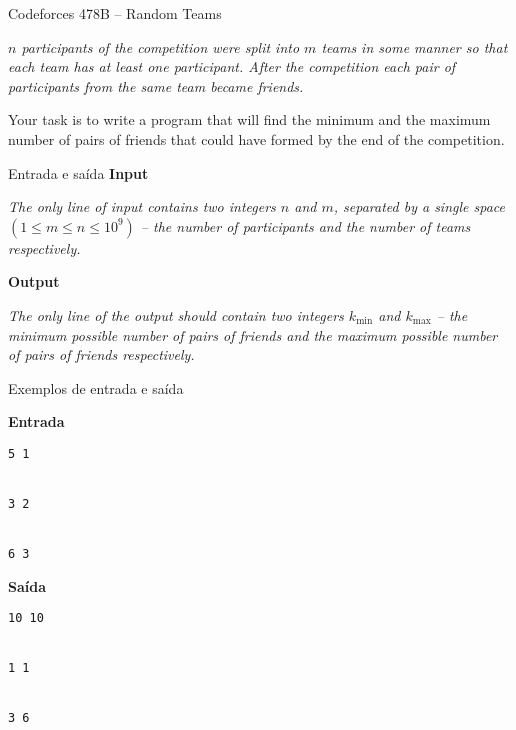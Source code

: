 \begin{frame}[fragile]{Codeforces 478B -- Random Teams}

{\it
$n$ participants of the competition were split into $m$ teams in some manner so that each team has at least one participant. After the competition each pair of participants from the same team became friends.

Your task is to write a program that will find the minimum and the maximum number of pairs of friends that could have formed by the end of the competition.
}

\end{frame}

\begin{frame}[fragile]{Entrada e saída}
\textbf{Input}

{\it
The only line of input contains two integers $n$ and $m$, separated by a single space $(1 \leq m \leq n \leq 10^9)$ -- the number of participants and the number of teams respectively.
}

\vspace{0.2in}

\textbf{Output}

{\it
The only line of the output should contain two integers $k_{\min}$ and $k_{\max}$ -- the minimum possible number of pairs of friends and the maximum possible number of pairs of friends respectively.
}

\end{frame}

\begin{frame}[fragile]{Exemplos de entrada e saída}

\begin{minipage}[t]{0.45\textwidth}
\textbf{Entrada}
\begin{verbatim}
5 1


3 2


6 3
\end{verbatim}
\end{minipage}
\begin{minipage}[t]{0.5\textwidth}
\textbf{Saída}
\begin{verbatim}
10 10


1 1


3 6
\end{verbatim}
\end{minipage}

\end{frame}


